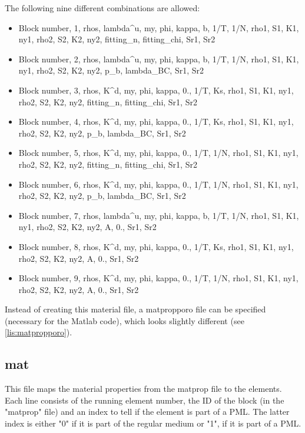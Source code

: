 		    The following nine different combinations are allowed:
			\begin{itemize}	    
\item Block number, 1, rhos, lambda\^{}u, my, phi, kappa, b,  1/T, 1/N, rho1, S1, K1, ny1, rho2, S2, K2, ny2, fitting\_n, fitting\_chi, Sr1, Sr2
\item Block number, 2, rhos, lambda\^{}u, my, phi, kappa, b,  1/T, 1/N, rho1, S1, K1, ny1, rho2, S2, K2, ny2, p\_b,       lambda\_BC,   Sr1, Sr2
\item Block number, 3, rhos, K\^{}d,      my, phi, kappa, 0., 1/T, Ks,  rho1, S1, K1, ny1, rho2, S2, K2, ny2, fitting\_n, fitting\_chi, Sr1, Sr2
\item Block number, 4, rhos, K\^{}d,      my, phi, kappa, 0., 1/T, Ks,  rho1, S1, K1, ny1, rho2, S2, K2, ny2, p\_b,       lambda\_BC,   Sr1, Sr2
\item Block number, 5, rhos, K\^{}d,      my, phi, kappa, 0., 1/T, 1/N, rho1, S1, K1, ny1, rho2, S2, K2, ny2, fitting\_n, fitting\_chi, Sr1, Sr2
\item Block number, 6, rhos, K\^{}d,      my, phi, kappa, 0., 1/T, 1/N, rho1, S1, K1, ny1, rho2, S2, K2, ny2, p\_b,       lambda\_BC,   Sr1, Sr2
\item Block number, 7, rhos, lambda\^{}u, my, phi, kappa, b,  1/T, 1/N, rho1, S1, K1, ny1, rho2, S2, K2, ny2, A,         0.,          Sr1, Sr2
\item Block number, 8, rhos, K\^{}d,      my, phi, kappa, 0., 1/T, Ks,  rho1, S1, K1, ny1, rho2, S2, K2, ny2, A,         0.,          Sr1, Sr2
\item Block number, 9, rhos, K\^{}d,      my, phi, kappa, 0., 1/T, 1/N, rho1, S1, K1, ny1, rho2, S2, K2, ny2, A,         0.,          Sr1, Sr2
\end{itemize} 
		  
		  
    		  Instead of creating this material file, a matpropporo file can be specified (necessary for the Matlab code), which looks slightly different (see \ref{lis:matpropporo}).

    
   
    	\subsection{mat}
    	\label{subsec:mat}
    		
    		This file maps the material properties from the matprop file to the elements. Each line consists of the running element number, the ID of the block (in the "matprop" file) and an index to tell if the element is part of a PML. The latter index is either "0" if it is part of the regular medium or "1", if it is part of a PML. 
